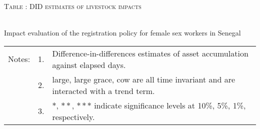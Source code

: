 \begin{table}
\hfil\textsc{\footnotesize Table \thetable: DID estimates of livestock impacts\label{FDlivestock}}\\
\setlength{\tabcolsep}{1pt}
\renewcommand{\arraystretch}{.6}
\hfil{}\\
\renewcommand{\arraystretch}{1}
Impact evaluation of the registration policy for female sex workers in Senegal
\vspace{-4ex}
\hfil\begin{tabular}{>{\hfill\scriptsize}p{1cm}<{}>{\hfill\scriptsize}p{.25cm}<{}>{\scriptsize}p{11.5cm}<{\hfill}}
Notes:& 1. & Difference-in-differences estimates of asset accumulation against elapsed days. \\[-1ex]
& 2. & \textsf{large, large grace, cow} are all time invariant and are interacted with a trend term. \\
& 3. & $*$, $**$, $***$ indicate significance levels at 10\%, 5\%, 1\%, respectively.\\
\end{tabular}
\end{table}

{\footnotesize
\setlength{\baselineskip}{11pt}
}


